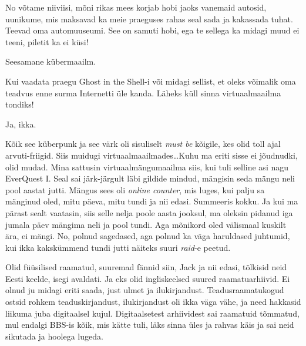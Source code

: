 
No võtame niiviisi, mõni rikas mees korjab hobi jaoks vanemaid autosid, uunikume, mis maksavad ka meie praeguses rahas seal sada ja kakassada tuhat. Teevad oma automuuseumi. See on samuti hobi, ega te sellega ka midagi muud ei teeni, piletit ka ei küsi!
       
Seesamane kübermaailm. 

Kui vaadata praegu Ghost in the Shell-i või midagi sellist, et oleks võimalik oma teadvus enne surma Internetti üle kanda. Läheks küll sinna virtuaalmaailma tondiks!  

Ja, ikka.

                 
Kõik see küberpunk ja see värk oli sisuliselt \emph{must be} kõigile, kes olid toll ajal arvuti-friigid. Siis muidugi virtuaalmaailmades\ldots Kuhu ma eriti sisse ei jõudnudki, olid mudad. Mina sattusin virtuaalmängumaailma siis, kui tuli selline asi nagu EverQuest I. Seal sai järk-järgult läbi gildide mindud, mängisin seda mängu neli pool aastat jutti. Mängus sees oli \emph{online counter}, mis luges, kui palju sa mänginud oled, mitu päeva, mitu tundi ja nii edasi. Summeeris kokku. Ja kui ma pärast sealt vaatasin, siis selle nelja poole aasta jooksul, ma oleksin pidanud iga jumala päev mängima neli ja pool tundi. Aga mõnikord oled välismaal kuskilt ära, ei mängi. No, polnud sagedased, aga polnud ka väga haruldased juhtumid, kui ikka kakskümmend tundi jutti näiteks suuri \emph{raid}-e peetud.
                 

Olid füüsilised raamatud, suuremad fännid siin, Jack ja nii edasi, tõlkisid neid Eesti keelde,  isegi avaldati. Ja eks olid ingliskeelsed suured raamatuarhiivid. Ei olnud ju midagi eriti saada, just ulmet ja ilukirjandust. Teadusraamatukogud  ostsid rohkem teaduskirjandust,  ilukirjandust oli ikka väga vähe, ja need hakkasid liikuma juba digitaalsel kujul. Digitaalsetest arhiividest sai raamatuid tõmmatud, mul endalgi BBS-is kõik, mis kätte tuli, läks sinna üles ja rahvas käis ja sai neid sikutada ja hoolega lugeda. 


